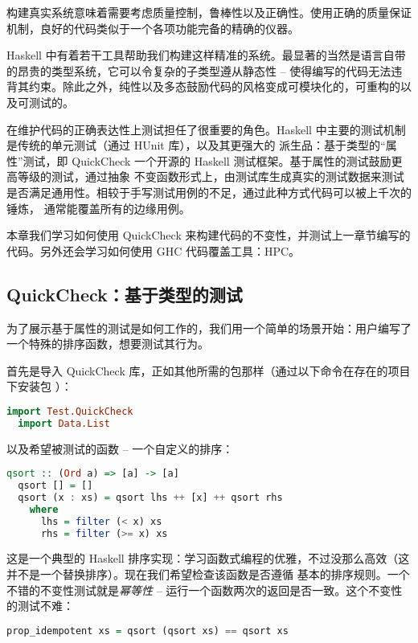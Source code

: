 \documentclass[./main.tex]{subfiles}
\begin{document}
构建真实系统意味着需要考虑质量控制，鲁棒性以及正确性。使用正确的质量保证机制，良好的代码类似于一个各项功能完备的精确的仪器。

Haskell 中有着若干工具帮助我们构建这样精准的系统。最显著的当然是语言自带的昂贵的类型系统，它可以令复杂的子类型遵从静态性 --
使得编写的代码无法违背其约束。除此之外，纯性以及多态鼓励代码的风格变成可模块化的，可重构的以及可测试的。

在维护代码的正确表达性上测试担任了很重要的角色。Haskell 中主要的测试机制是传统的单元测试（通过 HUnit 库），以及其更强大的
派生品：基于类型的“属性”测试，即 QuickCheck 一个开源的 Haskell 测试框架。基于属性的测试鼓励更高等级的测试，通过抽象
不变函数形式上，由测试库生成真实的测试数据来测试是否满足通用性。相较于手写测试用例的不足，通过此种方式代码可以被上千次的锤炼，
通常能覆盖所有的边缘用例。

本章我们学习如何使用 QuickCheck 来构建代码的不变性，并测试上一章节编写的代码。另外还会学习如何使用 GHC 代码覆盖工具：HPC。

\subsection*{QuickCheck：基于类型的测试}

为了展示基于属性的测试是如何工作的，我们用一个简单的场景开始：用户编写了一个特殊的排序函数，想要测试其行为。

首先是导入 QuickCheck 库，正如其他所需的包那样（通过以下命令在存在的项目下安装包
）：

\begin{lstlisting}[language=Haskell]
  import Test.QuickCheck
  import Data.List
\end{lstlisting}

以及希望被测试的函数 -- 一个自定义的排序：

\begin{lstlisting}[language=Haskell]
  qsort :: (Ord a) => [a] -> [a]
  qsort [] = []
  qsort (x : xs) = qsort lhs ++ [x] ++ qsort rhs
    where
      lhs = filter (< x) xs
      rhs = filter (>= x) xs
\end{lstlisting}

这是一个典型的 Haskell 排序实现：学习函数式编程的优雅，不过没那么高效（这并不是一个替换排序）。现在我们希望检查该函数是否遵循
基本的排序规则。一个不错的不变性测试就是\textit{幂等性} -- 运行一个函数两次的返回是否一致。这个不变性的测试不难：

\begin{lstlisting}[language=Haskell]
  prop_idempotent xs = qsort (qsort xs) == qsort xs
\end{lstlisting}
\end{document}
